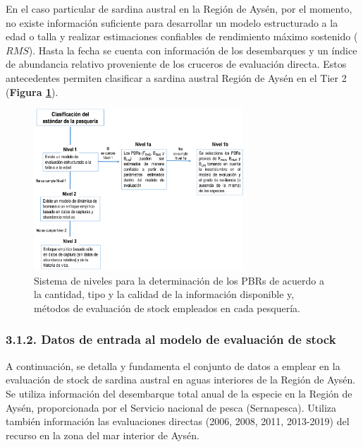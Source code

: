 \documentclass[
  spanish,
]{article}
\begin{document}
En el caso particular de sardina austral en la Región de Aysén, por el
momento, no existe información suficiente para desarrollar un modelo
estructurado a la edad o talla y realizar estimaciones confiables de
rendimiento máximo sostenido (\(RMS\)). Hasta la fecha se cuenta con
información de los desembarques y un índice de abundancia relativo
proveniente de los cruceros de evaluación directa. Estos antecedentes
permiten clasificar a sardina austral Región de Aysén en el Tier 2
(\textbf{Figura \ref{Fig6}}).

\vspace{0.5cm}

\begin{figure}[htb!]
\centering
\includegraphics[width=0.7\textwidth]{Figuras/Fig7_InformeFinal.png}
\caption{Sistema de niveles para la determinación de los PBRs de acuerdo a la cantidad, tipo y la calidad de la información disponible y, métodos de evaluación de stock empleados en cada pesquería.}
\label{Fig6}
\end{figure}

\hypertarget{datos-de-entrada-al-modelo-de-evaluaciuxf3n-de-stock}{%
\subsubsection{3.1.2. Datos de entrada al modelo de evaluación de
stock}\label{datos-de-entrada-al-modelo-de-evaluaciuxf3n-de-stock}}

A continuación, se detalla y fundamenta el conjunto de datos a emplear
en la evaluación de stock de sardina austral en aguas interiores de la
Región de Aysén. Se utiliza información del desembarque total anual de
la especie en la Región de Aysén, proporcionada por el Servicio nacional
de pesca (Sernapesca). Utiliza también información las evaluaciones
directas (2006, 2008, 2011, 2013-2019) del recurso en la zona del mar
interior de Aysén.
\end{document}
